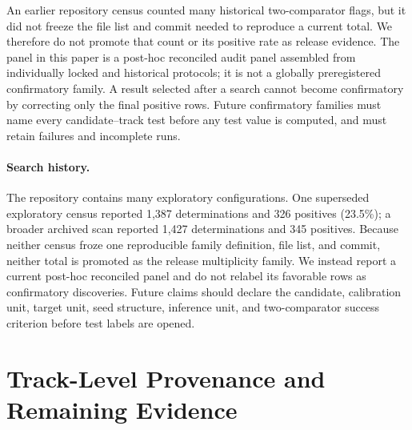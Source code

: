 An earlier repository census counted many historical two-comparator flags, but it did not freeze the
file list and commit needed to reproduce a current total. We therefore do not promote that count or
its positive rate as release evidence. The panel in this paper is a post-hoc reconciled audit panel
assembled from individually locked and historical protocols; it is not a globally preregistered
confirmatory family. A result selected after a search cannot become confirmatory by correcting only
the final positive rows. Future confirmatory families must name every candidate--track test before
any test value is computed, and must retain failures and incomplete runs.

\paragraph{Search history.}
The repository contains many exploratory configurations. One superseded exploratory census reported
1,387 determinations and 326 positives (23.5\%); a broader archived scan reported 1,427
determinations and 345 positives. Because neither census froze one reproducible family definition,
file list, and commit, neither total is promoted as the release
multiplicity family. We instead report a current post-hoc reconciled panel and do not relabel its
favorable rows as confirmatory discoveries. Future claims should declare the candidate, calibration
unit, target unit, seed structure, inference unit, and two-comparator success criterion before test
labels are opened.

\section{Track-Level Provenance and Remaining Evidence}
\label{app:compact-provenance}

